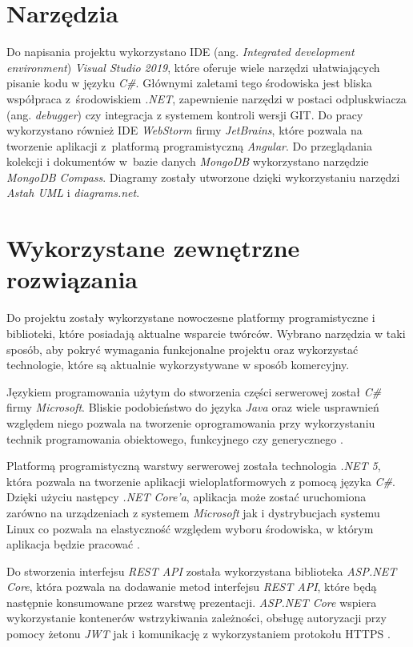 \documentclass[a4paper,twoside,12pt]{book}
\newcommand{\obcy}[1]{\emph{#1}}
\newcommand{\ang}[1]{{\selectlanguage{british}\obcy{#1}}}
\begin{document}
	\section{Narzędzia}
	Do napisania projektu wykorzystano IDE (ang. \ang{Integrated development environment}) \textit{Visual Studio 2019}, które oferuje wiele narzędzi ułatwiających pisanie kodu w języku \textit{C\#}. Głównymi zaletami tego środowiska jest bliska współpraca z~środowiskiem \textit{.NET}, zapewnienie narzędzi w postaci odpluskwiacza (ang. \ang{debugger}) czy integracja z systemem kontroli wersji GIT. Do pracy wykorzystano również IDE \textit{WebStorm} firmy \textit{JetBrains}, które pozwala na tworzenie aplikacji z~platformą programistyczną \textit{Angular}. Do przeglądania kolekcji i dokumentów w~bazie danych \textit{MongoDB} wykorzystano narzędzie \textit{MongoDB Compass}. Diagramy zostały utworzone dzięki wykorzystaniu narzędzi \textit{Astah UML} i \textit{diagrams.net}.
	
	\section{Wykorzystane zewnętrzne rozwiązania}
	Do projektu zostały wykorzystane nowoczesne platformy programistyczne i biblioteki, które posiadają aktualne wsparcie twórców. Wybrano narzędzia w taki sposób, aby pokryć wymagania funkcjonalne projektu oraz wykorzystać technologie, które są aktualnie wykorzystywane w sposób komercyjny.
	
	Językiem programowania użytym do stworzenia części serwerowej został \textit{C\#} firmy \textit{Microsoft}. Bliskie podobieństwo do języka \textit{Java} oraz wiele usprawnień względem niego pozwala na tworzenie oprogramowania przy wykorzystaniu technik programowania obiektowego, funkcyjnego czy generycznego \cite{bib:csharp}.
	
	Platformą programistyczną warstwy serwerowej została technologia \textit{.NET 5}, która pozwala na tworzenie aplikacji wieloplatformowych z pomocą języka \textit{C\#}. Dzięki użyciu następcy \textit{.NET Core'a}, aplikacja może zostać uruchomiona zarówno na urządzeniach z systemem \textit{Microsoft} jak i dystrybucjach systemu Linux co pozwala na elastyczność względem wyboru środowiska, w którym aplikacja będzie pracować \cite{bib:dotnet5introduction}.
	
	Do stworzenia interfejsu \textit{REST API} została wykorzystana biblioteka \textit{ASP.NET Core}, która pozwala na dodawanie metod interfejsu \textit{REST API}, które będą następnie konsumowane przez warstwę prezentacji. \textit{ASP.NET Core} wspiera wykorzystanie kontenerów wstrzykiwania zależności, obsługę autoryzacji przy pomocy żetonu \textit{JWT} jak i komunikację z wykorzystaniem protokołu HTTPS \cite{bib:asp}.
	
\end{document}
